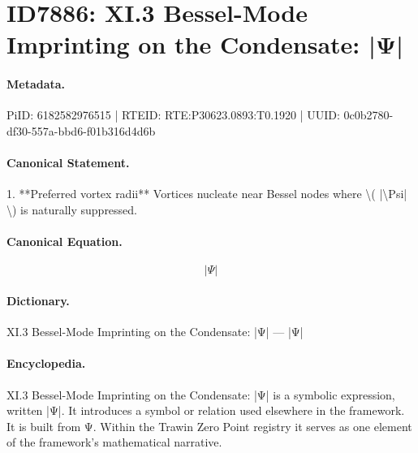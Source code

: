 \section*{ID7886: XI.3 Bessel-Mode Imprinting on the Condensate: |Ψ|}
\paragraph{Metadata.}
PiID: 6182582976515 | RTEID: RTE:P30623.0893:T0.1920 | UUID: 0c0b2780-df30-557a-bbd6-f01b316d4d6b

\paragraph{Canonical Statement.}
1. **Preferred vortex radii** Vortices nucleate near Bessel nodes where \textbackslash{}( |\textbackslash{}Psi| \textbackslash{}) is naturally suppressed.

\paragraph{Canonical Equation.}
\[
|\Psi|
\]

\paragraph{Dictionary.}
XI.3 Bessel-Mode Imprinting on the Condensate: |Ψ| — |Ψ|

\paragraph{Encyclopedia.}
XI.3 Bessel-Mode Imprinting on the Condensate: |Ψ| is a symbolic expression, written |Ψ|. It introduces a symbol or relation used elsewhere in the framework. It is built from Ψ. Within the Trawin Zero Point registry it serves as one element of the framework's mathematical narrative.
